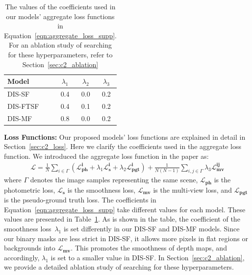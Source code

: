\begin{table}[t]
    \begin{center}
        \begin{tabular}{lccc}
        \hline
        Model & $\lambda_{1}$ & $\lambda_{2}$ & $\lambda_{3}$ \\
        \hline
        DIS-SF & 0.4 & 0.0 & 0.2 \\
        DIS-FTSF & 0.4 & 0.1 & 0.2 \\
        DIS-MF & 0.8 & 0.0 & 0.2 \\
        \hline
        \end{tabular}
    \end{center}
    \caption{The values of the coefficients used in our models' aggregate loss functions in Equation~\eqref{eqn:aggregate_loss_supp}. For an ablation study of searching for these hyperparameters, refer to Section~\ref{sec:c2_ablation}}
    \label{table:coef_supp}
\end{table}

\bigbreak\noindent\textbf{Loss Functions:} Our proposed models' loss functions are explained in detail in Section~\ref{sec:c2_loss}. Here we clarify the coefficients used in the aggregate loss function. We introduced the aggregate loss function in the paper as:
\begin{align}
     \boldsymbol{\mathcal{L}} = \frac{1}{N}\sum_{i \in \Gamma} (\boldsymbol{\mathcal{L}^{i}_{ph}} + \lambda_{1}\boldsymbol{\mathcal{L}^{i}_{s}} + \lambda_{2}\boldsymbol{\mathcal{L}^{i}_{pgt}})
    + \frac{1}{N(N-1)}\sum_{i,j \in \Gamma} \lambda_{3}\boldsymbol{\mathcal{L}^{ij}_{mv}}
    \label{eqn:aggregate_loss_supp}
\end{align}
where $\Gamma$ denotes the image samples representing the same scene, $\boldsymbol{\mathcal{L}_{ph}}$ is the photometric loss, $\boldsymbol{\mathcal{L}_s}$ is the smoothness loss, $\boldsymbol{\mathcal{L}_{mv}}$ is the multi-view loss, and $\boldsymbol{\mathcal{L}_{pgt}}$ is the pseudo-ground truth loss. The coefficients in Equation~\eqref{eqn:aggregate_loss_supp} take different values for each model. These values are presented in Table~\ref{table:coef_supp}. As is shown in the table, the coefficient of the smoothness loss~$\lambda_{1}$ is set differently in our DIS-SF and DIS-MF models. Since our binary masks are less strict in DIS-SF, it allows more pixels in flat regions or backgrounds into $\boldsymbol{\mathcal{L}_{mv}}$. This promotes the smoothness of depth maps, and accordingly, $\lambda_{1}$ is set to a smaller value in DIS-SF. In Section~\ref{sec:c2_ablation}, we provide a detailed ablation study of searching for these hyperparameters.

